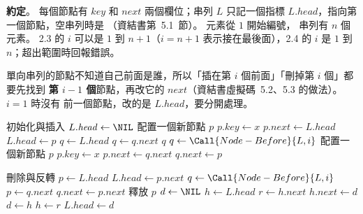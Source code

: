 \begin{pastsoln}
\textbf{約定}。 每個節點有 $\mathit{key}$ 和 $\mathit{next}$ 兩個欄位；串列 $L$ 只記一個指標
$L.\mathit{head}$，指向第一個節點，空串列時是 \NIL（資結書第~5.1~節）。 元素從 $1$ 開始編號，
串列有 $n$ 個元素。 2.3 的 $i$ 可以是 $1$ 到 $n + 1$（$i = n + 1$ 表示接在最後面），2.4 的 $i$ 是
$1$ 到 $n$；超出範圍時回報錯誤。

單向串列的節點不知道自己前面是誰，所以「插在第 $i$ 個前面」「刪掉第 $i$ 個」都要先找到
\textbf{第 $i - 1$ 個}節點，再改它的 $\mathit{next}$（資結書虛擬碼~5.2、5.3 的做法）。 $i = 1$ 時沒有
前一個節點，改的是 $L.\mathit{head}$，要分開處理。

\begin{pseudo}{初始化與插入}
 
    \State $L.\mathit{head} \gets \NIL$
\EndProcedure
\Statex
{} 
    \State 配置一個新節點 $p$
    \State $p.\mathit{key} \gets x$
    \State $p.\mathit{next} \gets L.\mathit{head}$
    \State $L.\mathit{head} \gets p$
\EndProcedure
\Statex
{} 
    \State $q \gets L.\mathit{head}$
            \State {}
        \EndIf
        \State $q \gets q.\mathit{next}$
    \EndFor
        \State {}
    \EndIf
    \State \Return $q$
\EndFunction
\Statex
{} 
        \State {}
    \Else
        \State $q \gets \Call{Node-Before}{L, i}$
        \State 配置一個新節點 $p$
        \State $p.\mathit{key} \gets x$
        \State $p.\mathit{next} \gets q.\mathit{next}$ 
        \State $q.\mathit{next} \gets p$
    \EndIf
\EndProcedure
\end{pseudo}

\begin{pseudo}{刪除與反轉}
 
        \State {}
    \EndIf
        \State $p \gets L.\mathit{head}$
        \State $L.\mathit{head} \gets p.\mathit{next}$
    \Else
        \State $q \gets \Call{Node-Before}{L, i}$
            \State {}
        \EndIf
        \State $p \gets q.\mathit{next}$
        \State $q.\mathit{next} \gets p.\mathit{next}$
    \EndIf
    \State 釋放 $p$
\EndProcedure
\Statex
{} 
    \State $d \gets \NIL$ 
    \State $h \gets L.\mathit{head}$ 
        \State $r \gets h.\mathit{next}$ 
        \State $h.\mathit{next} \gets d$
        \State $d \gets h$
        \State $h \gets r$
    \EndWhile
    \State $L.\mathit{head} \gets d$
\EndProcedure
\end{pseudo}


\end{pastsoln}
